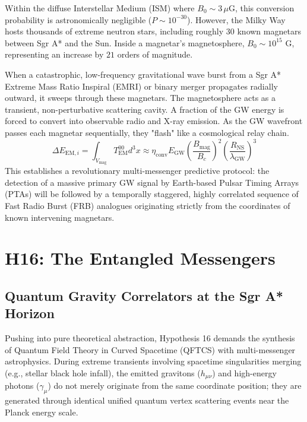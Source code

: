 \documentclass[12pt,a4paper]{article}
\begin{document}
Within the diffuse Interstellar Medium (ISM) where $B_0 \sim 3 \, \mu\text{G}$, this conversion probability is astronomically negligible ($P \sim 10^{-30}$). However, the Milky Way hosts thousands of extreme neutron stars, including roughly 30 known magnetars between Sgr A* and the Sun. Inside a magnetar's magnetosphere, $B_0 \sim 10^{15}$ G, representing an increase by $21$ orders of magnitude. 

When a catastrophic, low-frequency gravitational wave burst from a Sgr A* Extreme Mass Ratio Inspiral (EMRI) or binary merger propagates radially outward, it sweeps through these magnetars. The magnetosphere acts as a transient, non-perturbative scattering cavity. A fraction of the GW energy is forced to convert into observable radio and X-ray emission. As the GW wavefront passes each magnetar sequentially, they "flash" like a cosmological relay chain. 
\begin{equation}
    \Delta E_{\text{EM}, i} = \int_{V_{\text{mag}}} T^{00}_{\text{EM}} d^3x \approx \eta_{\text{conv}} E_{\text{GW}} \left( \frac{B_{\text{mag}}}{B_c} \right)^2 \left( \frac{R_{\text{NS}}}{\lambda_{\text{GW}}} \right)^3
\end{equation}
This establishes a revolutionary multi-messenger predictive protocol: the detection of a massive primary GW signal by Earth-based Pulsar Timing Arrays (PTAs) will be followed by a temporally staggered, highly correlated sequence of Fast Radio Burst (FRB) analogues originating strictly from the coordinates of known intervening magnetars.

\section{H16: The Entangled Messengers}
\subsection{Quantum Gravity Correlators at the Sgr A* Horizon}

Pushing into pure theoretical abstraction, Hypothesis 16 demands the synthesis of Quantum Field Theory in Curved Spacetime (QFTCS) with multi-messenger astrophysics. During extreme transients involving spacetime singularities merging (e.g., stellar black hole infall), the emitted gravitons ($h_{\mu\nu}$) and high-energy photons ($\gamma_{\mu}$) do not merely originate from the same coordinate position; they are generated through identical unified quantum vertex scattering events near the Planck energy scale.
\end{document}
